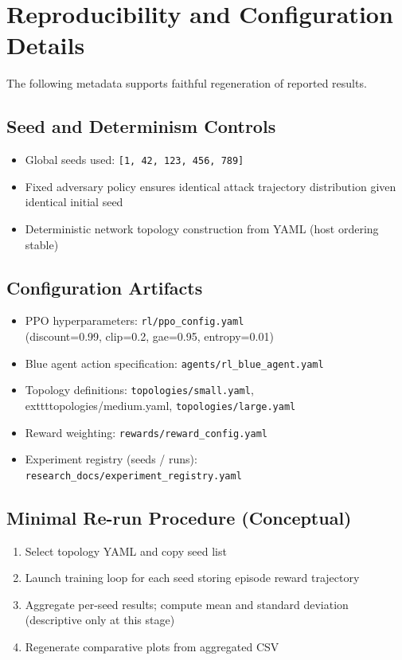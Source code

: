 \documentclass[12pt,twoside]{article}
\theoremstyle{definition}
\theoremstyle{plain}
\begin{document}
\section{Reproducibility and Configuration Details}

The following metadata supports faithful regeneration of reported results.

\subsection{Seed and Determinism Controls}
\begin{itemize}
    \item Global seeds used: \texttt{[1, 42, 123, 456, 789]}
    \item Fixed adversary policy ensures identical attack trajectory distribution given identical initial seed
    \item Deterministic network topology construction from YAML (host ordering stable)
\end{itemize}

\subsection{Configuration Artifacts}
\begin{itemize}
    \item PPO hyperparameters: \texttt{rl/ppo\_config.yaml} \\
          (discount=0.99, clip=0.2, gae=0.95, entropy=0.01)
    \item Blue agent action specification: \texttt{agents/rl\_blue\_agent.yaml}
    \item Topology definitions: \texttt{topologies/small.yaml}, \\
          	exttt{topologies/medium.yaml}, \texttt{topologies/large.yaml}
    \item Reward weighting: \texttt{rewards/reward\_config.yaml}
    \item Experiment registry (seeds / runs): \texttt{research\_docs/experiment\_registry.yaml}
\end{itemize}

\subsection{Minimal Re-run Procedure (Conceptual)}
\begin{enumerate}
    \item Select topology YAML and copy seed list
    \item Launch training loop for each seed storing episode reward trajectory
    \item Aggregate per-seed results; compute mean and standard deviation (descriptive only at this stage)
    \item Regenerate comparative plots from aggregated CSV
\end{enumerate}
\end{document}
